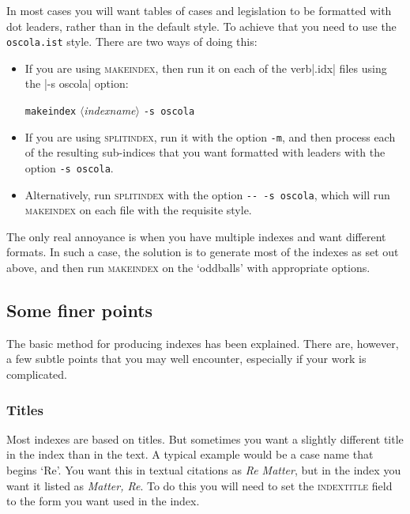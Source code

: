\documentclass[a4paper,
               11pt,
	       DIV=1,			   
	       footinclude=false]
	      {scrartcl}
\newcommand\angledtext[1]{$\langle$\textit{#1}\/$\rangle$}
\begin{document}
In most cases you will want tables of cases and legislation to be
formatted with dot leaders, rather than in the default style. To
achieve that you need to use the \verb|oscola.ist| style. There are
two ways of doing this:
\begin{itemize}
\item If you are using \textsc{makeindex}, then run it on each of the verb|.idx| files using the |-s oscola| option:
\begin{center}
  \texttt{makeindex} \angledtext{indexname} \texttt{-s oscola}
\end{center}
\item If you are using \textsc{splitindex}, run it with the option
  \verb|-m|, and then process each of the resulting sub-indices that
  you want formatted with leaders with the option \verb|-s oscola|.
\item Alternatively, run \textsc{splitindex} with the option \verb|-- -s oscola|, which will run \textsc{makeindex} on each file with the requisite style.
\end{itemize}

The only real annoyance is when you have multiple indexes and want
different formats. In such a case, the solution is to generate most of
the indexes as set out above, and then run \textsc{makeindex} on the
`oddballs' with appropriate options.

\subsection{Some finer points}

The basic method for producing indexes has been explained. There are,
however, a few subtle points that you may well encounter, especially
if your work is complicated.

\subsubsection{Titles}

Most indexes are based on titles. But sometimes you want a slightly
different title in the index than in the text. A typical example would
be a case name that begins `Re'. You want this in textual citations as
\emph{Re Matter}, but in the index you want it listed as \emph{Matter,
  Re}. To do this you will need to set the \textsc{indextitle} field
to the form you want used in the index.
\end{document}
